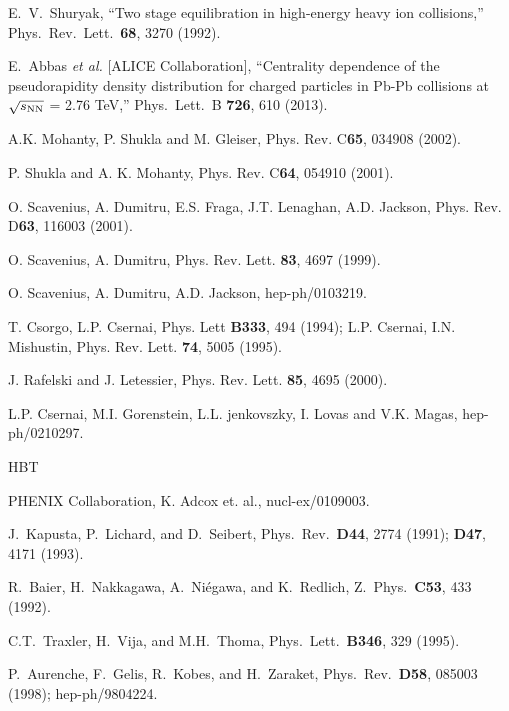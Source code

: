 \documentclass[aps,prc,preprint,superscriptaddress,showpacs,showkeys]{revtex4-1}
\begin{document}
\begin{thebibliography}{00}
  E.~V.~Shuryak,
  ``Two stage equilibration in high-energy heavy ion collisions,''
  Phys.\ Rev.\ Lett.\  {\bf 68}, 3270 (1992).
  
  E.~Abbas {\it et al.}  [ALICE Collaboration],
  ``Centrality dependence of the pseudorapidity density distribution for charged particles 
  in Pb-Pb collisions at $\sqrt{s_{\rm NN}}$ = 2.76 TeV,''
  Phys.\ Lett.\ B {\bf 726}, 610 (2013).


 A.K. Mohanty, P. Shukla and M. Gleiser,
              Phys. Rev. C{\bf 65}, 034908 (2002).
              
 P. Shukla and A. K. Mohanty, Phys. Rev. C{\bf 64},
        054910 (2001).              

 O. Scavenius, A. Dumitru, E.S. Fraga, J.T. Lenaghan,
         A.D. Jackson, Phys. Rev. D{\bf 63}, 116003 (2001).

 O. Scavenius, A. Dumitru,
         Phys. Rev. Lett. {\bf 83}, 4697 (1999).
         
 O. Scavenius, A. Dumitru, A.D. Jackson, 
          hep-ph/0103219.
          
 T. Csorgo, L.P. Csernai, Phys. Lett {\bf B333}, 494 (1994);
       L.P. Csernai, I.N. Mishustin, Phys. Rev. Lett. {\bf 74}, 5005 (1995).
       
 J. Rafelski and J. Letessier, Phys. Rev. Lett. {\bf 85},
                  4695 (2000).

 L.P. Csernai, M.I. Gorenstein, L.L. jenkovszky, 
                        I. Lovas and V.K. Magas, hep-ph/0210297.

 HBT

 PHENIX Collaboration, K. Adcox et. al., 
                    nucl-ex/0109003.

 J.\ Kapusta, P.\ Lichard, and D.\ Seibert, 
   Phys.\ Rev.\ {\bf D44}, 2774 (1991); {\bf D47}, 4171 (1993). 

 R.\ Baier, H.\ Nakkagawa, A.\ Ni\'{e}gawa, and
K.\ Redlich, Z.\ Phys.\ {\bf C53}, 433 (1992).

 C.T.\ Traxler, H.\ Vija, and M.H.\ Thoma,
Phys.\ Lett.\ {\bf B346}, 329 (1995).
  
 P.\ Aurenche, F.\ Gelis, R.\ Kobes, and H.\ Zaraket,
  Phys.\ Rev.\ {\bf D58}, 085003 (1998); \mbox{hep-ph/9804224}. 


\end{thebibliography}
\end{document}
